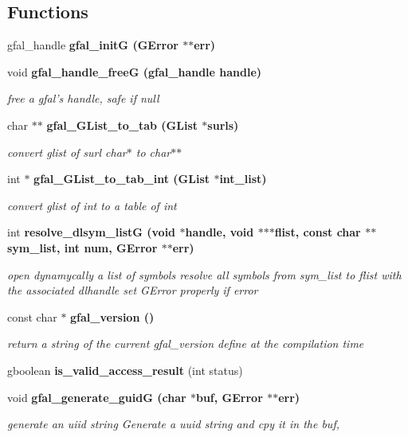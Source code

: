\subsection*{Functions}
\begin{CompactItemize}
\item 
gfal\_\-handle \bf{gfal\_\-init\-G} (GError $\ast$$\ast$err)
\item 
void \bf{gfal\_\-handle\_\-free\-G} (gfal\_\-handle handle)\label{gfal__common__all_8c_9dbd943eaed291897d852fc3ae560058}

\begin{CompactList}\small\item\em free a gfal's handle, safe if null \item\end{CompactList}\item 
char $\ast$$\ast$ \bf{gfal\_\-GList\_\-to\_\-tab} (GList $\ast$surls)
\begin{CompactList}\small\item\em convert glist of surl char$\ast$ to char$\ast$$\ast$ \item\end{CompactList}\item 
int $\ast$ \bf{gfal\_\-GList\_\-to\_\-tab\_\-int} (GList $\ast$int\_\-list)
\begin{CompactList}\small\item\em convert glist of int to a table of int \item\end{CompactList}\item 
int \bf{resolve\_\-dlsym\_\-list\-G} (void $\ast$handle, void $\ast$$\ast$$\ast$flist, const char $\ast$$\ast$sym\_\-list, int num, GError $\ast$$\ast$err)\label{gfal__common__all_8c_0323a4ab58106e316851c1ae06148e28}

\begin{CompactList}\small\item\em open dynamycally a list of symbols resolve all symbols from sym\_\-list to flist with the associated dlhandle set GError properly if error \item\end{CompactList}\item 
const char $\ast$ \bf{gfal\_\-version} ()
\begin{CompactList}\small\item\em return a string of the current gfal\_\-version define at the compilation time \item\end{CompactList}\item 
gboolean \textbf{is\_\-valid\_\-access\_\-result} (int status)\label{gfal__common__all_8c_aed64917ebc1c60ab8ccd2c4dfbd2c3a}

\item 
void \bf{gfal\_\-generate\_\-guid\-G} (char $\ast$buf, GError $\ast$$\ast$err)
\begin{CompactList}\small\item\em generate an uiid string Generate a uuid string and cpy it in the buf, \item\end{CompactList}\end{CompactItemize}


